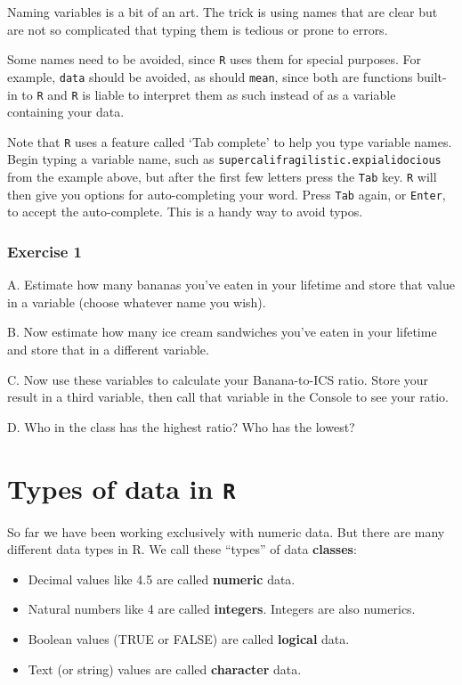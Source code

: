 \documentclass[
]{book}
\providecommand{\tightlist}{%
  \setlength{\itemsep}{0pt}\setlength{\parskip}{0pt}}
\begin{document}
Naming variables is a bit of an art. The trick is using names that are clear but are not so complicated that typing them is tedious or prone to errors.

Some names need to be avoided, since \texttt{R} uses them for special purposes. For example, \texttt{data} should be avoided, as should \texttt{mean}, since both are functions built-in to \texttt{R} and \texttt{R} is liable to interpret them as such instead of as a variable containing your data.

Note that \texttt{R} uses a feature called `Tab complete' to help you type variable names. Begin typing a variable name, such as \texttt{supercalifragilistic.expialidocious} from the example above, but after the first few letters press the \texttt{Tab} key. \texttt{R} will then give you options for auto-completing your word. Press \texttt{Tab} again, or \texttt{Enter}, to accept the auto-complete. This is a handy way to avoid typos.

\hypertarget{exercise-1-2}{%
\subsubsection*{Exercise 1}\label{exercise-1-2}}

A. Estimate how many bananas you've eaten in your lifetime and store that value in a variable (choose whatever name you wish).

B. Now estimate how many ice cream sandwiches you've eaten in your lifetime and store that in a different variable.

C. Now use these variables to calculate your Banana-to-ICS ratio. Store your result in a third variable, then call that variable in the Console to see your ratio.

D. Who in the class has the highest ratio? Who has the lowest?

\hypertarget{types-of-data-in-r}{%
\section*{\texorpdfstring{Types of data in \texttt{R}}{Types of data in R}}\label{types-of-data-in-r}}

So far we have been working exclusively with numeric data. But there are many different data types in R. We call these ``types'' of data \textbf{classes}:

\begin{itemize}
\tightlist
\item
  Decimal values like 4.5 are called \textbf{numeric} data.
\item
  Natural numbers like 4 are called \textbf{integers}. Integers are also numerics.
\item
  Boolean values (TRUE or FALSE) are called \textbf{logical} data.
\item
  Text (or string) values are called \textbf{character} data.
\end{itemize}
\end{document}
